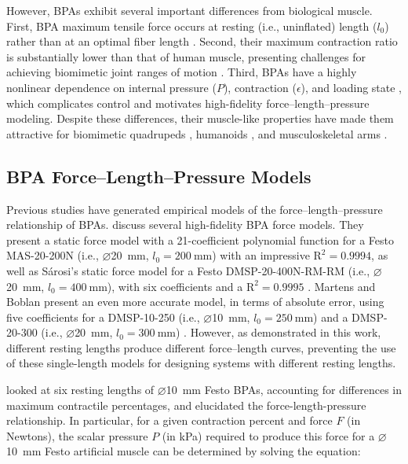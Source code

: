 However, BPAs exhibit several important differences from biological muscle. First, BPA maximum tensile force occurs at resting (i.e., uninflated) length ($l_0$) rather than at an optimal fiber length \citep{liang_comparative_2020}. Second, their maximum contraction ratio is substantially lower than that of human muscle, presenting challenges for achieving biomimetic joint ranges of motion \citep{hunt_modeling_2017, sarosi_comparative_2017, liang_comparative_2020}. Third, BPAs have a highly nonlinear dependence on internal pressure ($P$), contraction ($\epsilon$), and loading state \citep{hunt_modeling_2017, martens_modeling_2017}, which complicates control and motivates high-fidelity force--length--pressure modeling. Despite these differences, their muscle-like properties have made them attractive for biomimetic quadrupeds \citep{aschenbeck_design_2006, scharzenberger_design_2019}, humanoids \citep{asano_design_2017, hitzmann_anthropomorphic_2018}, and musculoskeletal arms \citep{kurumaya_musculoskeletal_2016, chen_realizing_2019}.

\subsection{BPA Force--Length--Pressure Models}\label{sec:bg_bpamodels}

Previous studies have generated empirical models of the force--length--pressure relationship of BPAs. \citet{sarosi_comparative_2017} discuss several high-fidelity BPA force models. They present a static force model with a 21-coefficient polynomial function for a Festo MAS-20-200N (i.e., $\diameter$\qty{20}{\mm}, $l_0=\qty{200}{\mm}$) with an impressive $\text{R}^2=0.9994$, as well as S\'arosi's static force model for a Festo DMSP-20-400N-RM-RM (i.e., $\diameter$\qty{20}{\mm}, $l_0=\qty{400}{\mm}$), with six coefficients and a $\text{R}^2=0.9995$ \citep{sarosi_new_2012, sarosi_investigation_2013}. Martens and Boblan present an even more accurate model, in terms of absolute error, using five coefficients for a DMSP-10-250 (i.e., $\diameter$\qty{10}{\mm}, $l_0=\qty{250}{\mm}$) and a DMSP-20-300 (i.e., $\diameter$\qty{20}{\mm}, $l_0=\qty{300}{\mm}$) \citep{martens_modeling_2017}. However, as demonstrated in this work, different resting lengths produce different force--length curves, preventing the use of these single-length models for designing systems with different resting lengths.

\citet{hunt_modeling_2017} looked at six resting lengths of $\diameter$\qty{10}{\mm} Festo BPAs, accounting for differences in maximum contractile percentages, and elucidated the force-length-pressure relationship. In particular, for a given contraction percent and force $F$ (in Newtons), the scalar pressure $P$ (in kPa) required to produce this force for a $\diameter$\qty{10}{\mm} Festo artificial muscle can be determined by solving the equation:

